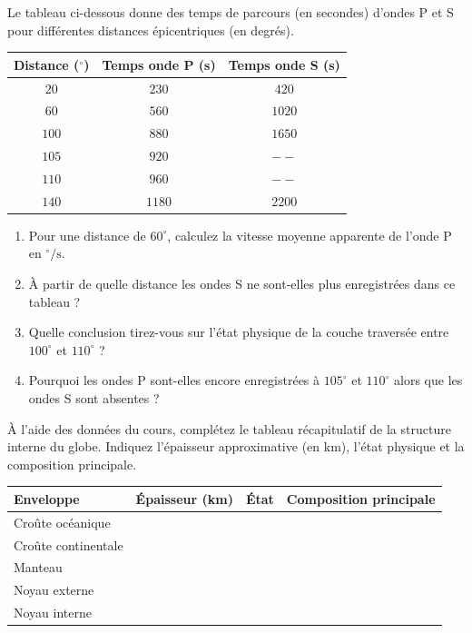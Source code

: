 \documentclass[11pt]{article}
\begin{document}
\begin{exercice}
Le tableau ci-dessous donne des temps de parcours (en secondes) d'ondes P et S pour différentes distances épicentriques (en degrés).

\begin{center}
\begin{tabular}{|c|c|c|}
\hline
Distance ($^\circ$) & Temps onde P (s) & Temps onde S (s) \\
\hline
$20$ & $230$ & $420$ \\
$60$ & $560$ & $1020$ \\
$100$ & $880$ & $1650$ \\
$105$ & $920$ & $--$ \\
$110$ & $960$ & $--$ \\
$140$ & $1180$ & $2200$ \\
\hline
\end{tabular}
\end{center}

\begin{enumerate}
    \item Pour une distance de $60^\circ$, calculez la vitesse moyenne apparente de l'onde P en $^\circ/\text{s}$.
    \item À partir de quelle distance les ondes S ne sont-elles plus enregistrées dans ce tableau ?
    \item Quelle conclusion tirez-vous sur l'état physique de la couche traversée entre $100^\circ$ et $110^\circ$ ?
    \item Pourquoi les ondes P sont-elles encore enregistrées à $105^\circ$ et $110^\circ$ alors que les ondes S sont absentes ?
\end{enumerate}
\end{exercice}

\begin{exercice}
À l'aide des données du cours, complétez le tableau récapitulatif de la structure interne du globe. Indiquez l'épaisseur approximative (en km), l'état physique et la composition principale.

\begin{center}
\begin{tabular}{|>{\raggedright\arraybackslash}p{3.5cm}|c|c|>{\raggedright\arraybackslash}p{4cm}|}
\hline
\textbf{Enveloppe} & \textbf{Épaisseur (km)} & \textbf{État} & \textbf{Composition principale} \\
\hline
Croûte océanique & & & \\
\hline
Croûte continentale & & & \\
\hline
Manteau & & & \\
\hline
Noyau externe & & & \\
\hline
Noyau interne & & & \\
\hline
\end{tabular}
\end{center}
\end{exercice}
\end{document}
